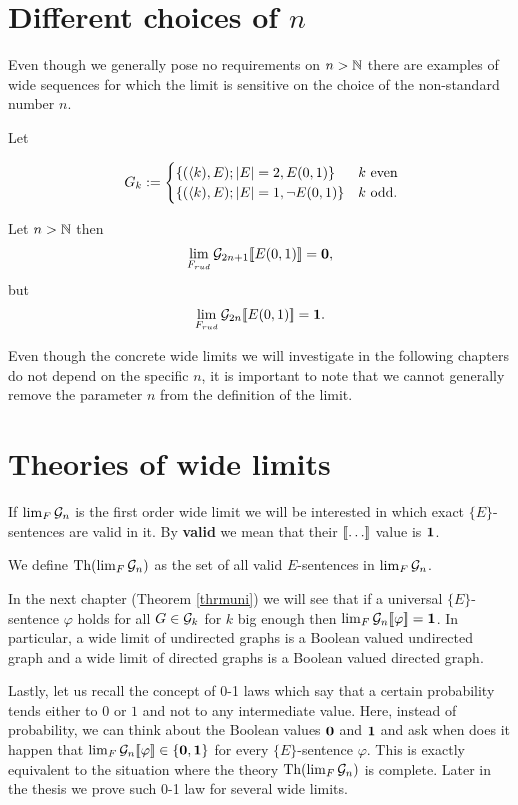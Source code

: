 \section{Different choices of \texorpdfstring{$n$}{n}}

Even though we generally pose no requirements on $n>\mathbb{N}$ there are examples of wide sequences for which the limit is sensitive on the choice of the non-standard number $n$. 

\begin{exam}
Let 

\[\
G_{k}:=
\begin{cases}
\{(\langle k),E);\left|{E}\right|=2,E(0,1)\}&\text{$k$ even}\\
\{(\langle k),E);\left|{E}\right|=1,\lnot E(0,1)\}&\text{$k$ odd.}\\
\end{cases}\]

Let $n>\mathbb{N}$ then
\begin{align}
\lim_{F_{rud}}\mathcal{G}_{2n+1} [\![ E(0,1)]\!] =\textbf{0},
\end{align}
but
\begin{align}
\lim_{F_{rud}}\mathcal{G}_{2n}[\![ E(0,1)]\!]=\textbf{1}.
\end{align}

Even though the concrete wide limits we will investigate in the following chapters do not depend on the specific $n$, it is important to note that we cannot generally remove the parameter $n$ from the definition of the limit.
\end{exam}

\section{Theories of wide limits}

If $\lim_F\mathcal{G}_n$ is the first order wide limit we will be interested in which exact $\{E\}$-sentences are valid in it. By \textbf{valid} we mean that their $\bbl\dots\bbr$ value is $\textbf{1}$.

\begin{defi}
We define $\text{Th}(\lim_F\mathcal{G}_n)$ as the set of all valid $E$-sentences in $\lim_{F}\mathcal{G}_n$.
\end{defi}

In the next chapter (Theorem \ref{thrmuni}) we will see that if a universal $\{E\}$-sentence $\varphi$ holds for all $G\in\mathcal{G}_k$ for $k$ big enough then $\lim_F\mathcal{G}_n[\![\varphi]\!]=\textbf{1}$. In particular, a wide limit of undirected graphs is a Boolean valued undirected graph and a wide limit of directed graphs is a Boolean valued directed graph.

Lastly, let us recall the concept of 0-1 laws which say that a certain probability tends either to $0$ or $1$ and not to any intermediate value. Here, instead of probability, we can think about the Boolean values $\textbf{0}$ and $\textbf{1}$ and ask when does it happen that $\lim_F\mathcal{G}_n[\![\varphi]\!]\in\{\textbf{0},\textbf{1}\}$ for every $\{E\}$-sentence $\varphi$. This is exactly equivalent to the situation where the theory $\text{Th}(\lim_F \mathcal{G}_n)$ is complete. Later in the thesis we prove such 0-1 law for several wide limits.
